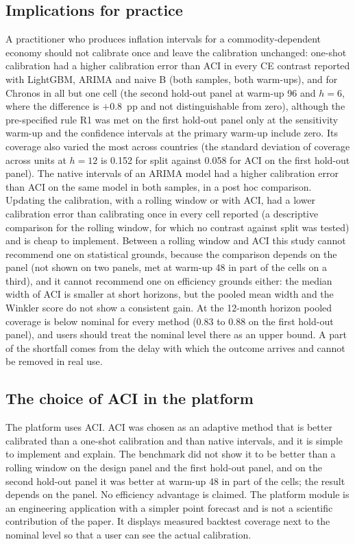 \subsection{Implications for practice}

A practitioner who produces inflation intervals for a commodity-dependent economy should not calibrate once and leave the calibration unchanged: one-shot calibration had a higher calibration error than ACI in every CE contrast reported with LightGBM, ARIMA and naive B (both samples, both warm-ups), and for Chronos in all but one cell (the second hold-out panel at warm-up 96 and $h=6$, where the difference is $+0.8$~pp and not distinguishable from zero), although the pre-specified rule R1 was met on the first hold-out panel only at the sensitivity warm-up and the confidence intervals at the primary warm-up include zero. Its coverage also varied the most across countries (the standard deviation of coverage across units at $h=12$ is 0.152 for split against 0.058 for ACI on the first hold-out panel). The native intervals of an ARIMA model had a higher calibration error than ACI on the same model in both samples, in a post hoc comparison. Updating the calibration, with a rolling window or with ACI, had a lower calibration error than calibrating once in every cell reported (a descriptive comparison for the rolling window, for which no contrast against split was tested) and is cheap to implement. Between a rolling window and ACI this study cannot recommend one on statistical grounds, because the comparison depends on the panel (not shown on two panels, met at warm-up 48 in part of the cells on a third), and it cannot recommend one on efficiency grounds either: the median width of ACI is smaller at short horizons, but the pooled mean width and the Winkler score do not show a consistent gain. At the 12-month horizon pooled coverage is below nominal for every method (0.83 to 0.88 on the first hold-out panel), and users should treat the nominal level there as an upper bound. A part of the shortfall comes from the delay with which the outcome arrives and cannot be removed in real use.

\subsection{The choice of ACI in the platform}

The platform uses ACI. ACI was chosen as an adaptive method that is better calibrated than a one-shot calibration and than native intervals, and it is simple to implement and explain. The benchmark did not show it to be better than a rolling window on the design panel and the first hold-out panel, and on the second hold-out panel it was better at warm-up 48 in part of the cells; the result depends on the panel. No efficiency advantage is claimed. The platform module is an engineering application with a simpler point forecast and is not a scientific contribution of the paper. It displays measured backtest coverage next to the nominal level so that a user can see the actual calibration.

